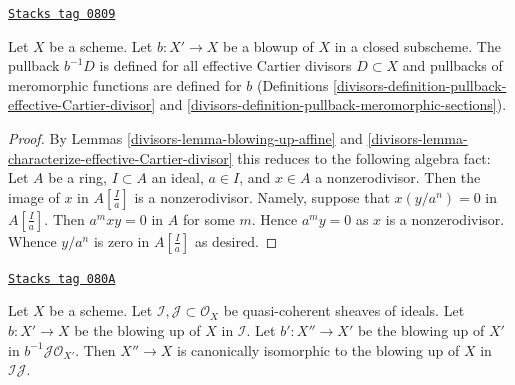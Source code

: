 \begin{lemma}
\label{divisors-lemma-blow-up-pullback-effective-Cartier}
\href{https://stacks.math.columbia.edu/tag/0809}{\texttt{Stacks tag 0809}}

Let $X$ be a scheme. Let $b : X' \to X$ be a blowup of $X$ in a closed
subscheme. The pullback $b^{-1}D$ is defined
for all effective Cartier divisors $D \subset X$
and pullbacks of meromorphic functions are defined for $b$
(Definitions
\ref{divisors-definition-pullback-effective-Cartier-divisor} and
\ref{divisors-definition-pullback-meromorphic-sections}).
\end{lemma}

\begin{proof}

By Lemmas \ref{divisors-lemma-blowing-up-affine} and
\ref{divisors-lemma-characterize-effective-Cartier-divisor}
this reduces to the following algebra fact:
Let $A$ be a ring, $I \subset A$ an ideal, $a \in I$, and $x \in A$
a nonzerodivisor. Then the image of $x$ in $A[\frac{I}{a}]$ is a
nonzerodivisor. Namely, suppose that $x (y/a^n) = 0$ in $A[\frac{I}{a}]$.
Then $a^mxy = 0$ in $A$ for some $m$. Hence $a^my = 0$ as $x$ is a
nonzerodivisor. Whence $y/a^n$ is zero in $A[\frac{I}{a}]$ as desired.
\end{proof}

\begin{lemma}
\label{divisors-lemma-blowing-up-two-ideals}
\href{https://stacks.math.columbia.edu/tag/080A}{\texttt{Stacks tag 080A}}

Let $X$ be a scheme. Let $\mathcal{I}, \mathcal{J} \subset \mathcal{O}_X$
be quasi-coherent sheaves of ideals. Let $b : X' \to X$
be the blowing up of $X$ in $\mathcal{I}$. Let $b' : X'' \to X'$ be the
blowing up of $X'$ in $b^{-1}\mathcal{J} \mathcal{O}_{X'}$. Then $X'' \to X$
is canonically isomorphic to the blowing up of $X$ in $\mathcal{I}\mathcal{J}$.
\end{lemma}


